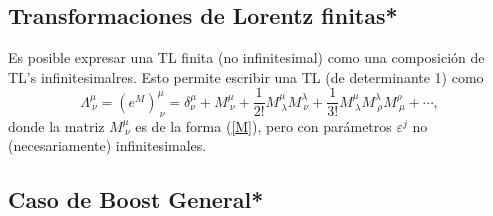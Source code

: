 \subsection{Transformaciones de Lorentz finitas*}
Es posible expresar una TL finita (no infinitesimal) como una composición de
TL's infinitesimalres. Esto permite escribir una TL (de determinante 1) como
\begin{equation}
\Lambda^\mu_{\ \nu}=\left( e^M\right)^\mu_{\ \nu}=\delta^\mu_\nu+M^\mu_{\
\nu}+\frac{1}{2!}M^\mu_{\ \lambda}M^\lambda_{\ \nu}+\frac{1}{3!}M^\mu_{\
\lambda}M^\lambda_{\ \rho}M^\rho_{\ \mu}+\cdots ,
\end{equation}
donde la matriz $M^\mu_{\ \nu}$ es de la forma (\ref{M}), pero con parámetros
$\varepsilon^j$ no (necesariamente) infinitesimales.

\subsection{Caso de Boost General*}


